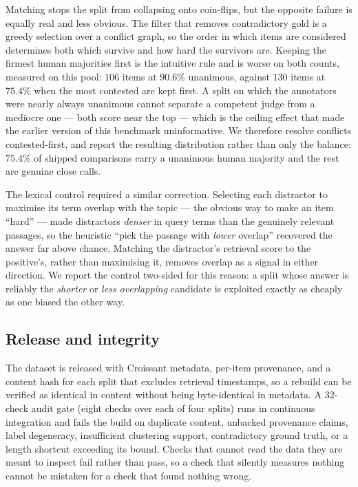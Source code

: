 Matching stops the split from collapsing onto coin-flips, but the opposite
failure is equally real and less obvious. The filter that removes contradictory
gold is a greedy selection over a conflict graph, so the order in which items are
considered determines both which survive and how hard the survivors are. Keeping
the firmest human majorities first is the intuitive rule and is worse on both
counts, measured on this pool: $106$ items at $90.6\%$ unanimous, against $130$
items at $75.4\%$ when the most contested are kept first. A split on which the
annotators were nearly always unanimous cannot separate a competent judge from a
mediocre one --- both score near the top --- which is the ceiling effect that
made the earlier version of this benchmark uninformative. We therefore resolve
conflicts contested-first, and report the resulting distribution rather than only
the balance: $75.4\%$ of shipped comparisons carry a unanimous human majority and
the rest are genuine close calls.

The lexical control required a similar correction. Selecting each distractor to
maximise its term overlap with the topic --- the obvious way to make an item
``hard'' --- made distractors \emph{denser} in query terms than the genuinely
relevant passages, so the heuristic ``pick the passage with \emph{lower} overlap''
recovered the answer far above chance. Matching the distractor's retrieval score
to the positive's, rather than maximising it, removes overlap as a signal in
either direction. We report the control two-sided for this reason: a split whose
answer is reliably the \emph{shorter} or \emph{less overlapping} candidate is
exploited exactly as cheaply as one biased the other way.

\subsection{Release and integrity}

The dataset is released with Croissant metadata, per-item provenance, and a
content hash for each split that excludes retrieval timestamps, so a rebuild can
be verified as identical in content without being byte-identical in metadata. A
32-check audit gate (eight checks over each of four splits) runs in continuous integration and fails the build on
duplicate content, unbacked provenance claims, label degeneracy, insufficient
clustering support, contradictory ground truth, or a length shortcut exceeding
its bound. Checks that cannot read the data they are meant to inspect fail
rather than pass, so a check that silently measures nothing cannot be mistaken
for a check that found nothing wrong.
